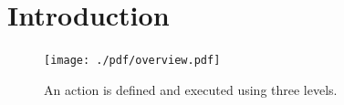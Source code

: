 \section{Introduction}
\label{intro}

% 
% 
\begin{figure}
      \centering
      \texttt{[image: ./pdf/overview.pdf]}
      \caption{An action is defined and executed using three levels.}
      \label{fig:overview}
\end{figure}


